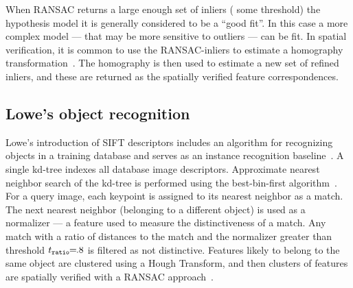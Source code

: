         When RANSAC returns a large enough set of inliers (\wrt{} some
          threshold) the hypothesis model it is generally considered to
          be a ``good fit''.
        In this case a more complex model --- that may be more
          sensitive to outliers --- can be fit.
        In spatial verification, it is common to use the RANSAC-inliers
          to estimate a homography
          transformation~\cite[311--320]{szeliski_computer_2010}.
        The homography is then used to estimate a new set of refined
          inliers, and these are returned as the spatially verified
          feature correspondences.


        \figSVInlier{}


    \subsection{Lowe's object recognition}

        Lowe's introduction of SIFT descriptors includes an algorithm
          for recognizing objects in a training database and serves as an
          instance recognition baseline~\cite{lowe_distinctive_2004}.
        A single kd-tree indexes all database image descriptors.
        Approximate nearest neighbor search of the kd-tree is performed
          using the best-bin-first algorithm~\cite{beis_shape_1997}.
        For a query image, each keypoint is assigned to its nearest
          neighbor as a match.
        The next nearest neighbor (belonging to a different object) is
          used as a normalizer --- a feature used to measure the
          distinctiveness of a match.
        Any match with a ratio of distances to the match and the
          normalizer greater than threshold $t_{\tt{ratio}}\mkern-6mu=\mkern-6mu.8$ is
          filtered as not distinctive.
        Features likely to belong to the same object are clustered
          using a Hough Transform, and then clusters of features are
          spatially verified with a RANSAC
          approach~\cite{fischler_random_1981}.


